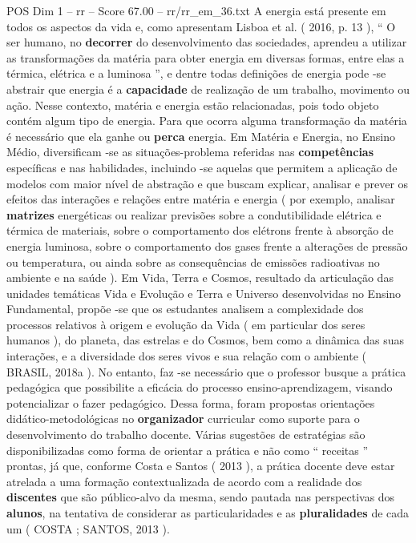 \begin{textsample}{POS Dim 1 – rr – Score 67.00 – rr/rr\_em\_36.txt}
A energia está presente em todos os aspectos da vida e, como apresentam Lisboa et al. ( 2016, p. 13 ), “ O ser humano, no \textbf{decorrer} do desenvolvimento das sociedades, aprendeu a utilizar as transformações da matéria para obter energia em diversas formas, entre elas a térmica, elétrica e a luminosa ”, e dentre todas definições de energia pode -se abstrair que energia é a \textbf{capacidade} de realização de um trabalho, movimento ou ação.
Nesse contexto, matéria e energia estão relacionadas, pois todo objeto contém algum tipo de energia.
Para que ocorra alguma transformação da matéria é necessário que ela ganhe ou \textbf{perca} energia.
Em Matéria e Energia, no Ensino Médio, diversificam -se as situações-problema referidas nas \textbf{competências} específicas e nas habilidades, incluindo -se aquelas que permitem a aplicação de modelos com maior nível de abstração e que buscam explicar, analisar e prever os efeitos das interações e relações entre matéria e energia ( por exemplo, analisar \textbf{matrizes} energéticas ou realizar previsões sobre a condutibilidade elétrica e térmica de materiais, sobre o comportamento dos elétrons frente à absorção de energia luminosa, sobre o comportamento dos gases frente a alterações de pressão ou temperatura, ou ainda sobre as consequências de emissões radioativas no ambiente e na saúde ).
Em Vida, Terra e Cosmos, resultado da articulação das unidades temáticas Vida e Evolução e Terra e Universo desenvolvidas no Ensino Fundamental, propõe -se que os estudantes analisem a complexidade dos processos relativos à origem e evolução da Vida ( em particular dos seres humanos ), do planeta, das estrelas e do Cosmos, bem como a dinâmica das suas interações, e a diversidade dos seres vivos e sua relação com o ambiente ( BRASIL, 2018a ).
No entanto, faz -se necessário que o professor busque a prática pedagógica que possibilite a eficácia do processo ensino-aprendizagem, visando potencializar o fazer pedagógico.
Dessa forma, foram propostas orientações didático-metodológicas no \textbf{organizador} curricular como suporte para o desenvolvimento do trabalho docente.
Várias sugestões de estratégias são disponibilizadas como forma de orientar a prática e não como “ receitas ” prontas, já que, conforme Costa e Santos ( 2013 ), a prática docente deve estar atrelada a uma formação contextualizada de acordo com a realidade dos \textbf{discentes} que são público-alvo da mesma, sendo pautada nas perspectivas dos \textbf{alunos}, na tentativa de considerar as particularidades e as \textbf{pluralidades} de cada um ( COSTA ; SANTOS, 2013 ).


\end{textsample}
